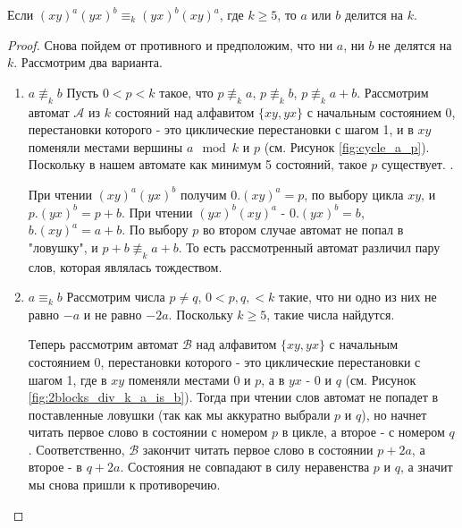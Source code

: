 \begin{lemma}\label{2blocks div k}
	Если $(xy)^a(yx)^b \equiv_k (yx)^b(xy)^a$, где $k \ge 5$, то $a$ или $b$ делится на $k$.
\end{lemma}
\begin{proof}
	Снова пойдем от противного и предположим, что ни $a$, ни $b$ не делятся на $k$. Рассмотрим два варианта.
	\begin{enumerate}
		\item $a \not \equiv_k b$
		Пусть $0 < p <k$ такое, что $p \not \equiv_k a$, $p \not \equiv_k b$, $p \not \equiv_k a+b$.
		Рассмотрим автомат $\mathscr{A}$ из $k$ состояний над алфавитом $\{xy, yx\}$ с начальным состоянием 0, перестановки которого - это циклические перестановки с шагом 1, и в $xy$ поменяли местами вершины $a \mod k$ и $p$ (см. Рисунок \ref{fig:cycle_a_p}). Поскольку в нашем автомате как минимум 5 состояний, такое $p$ существует. 
		.
		
		При чтении $(xy)^a(yx)^b$ получим $0.(xy)^a = p$, по выбору цикла $xy$, и $p.(yx)^b = p+b$.
		При чтении $(yx)^b(xy)^a$ - $0.(yx)^b = b$, $b.(xy)^a = a+b$. По выбору $p$ во втором случае автомат не попал в "ловушку", и $p+b \not \equiv_k a+b$.
		То есть рассмотренный автомат различил пару слов, которая являлась тождеством.
		
		\item $a \equiv_k b$
		Рассмотрим числа $p \ne q$, $0 < p, q, < k$ такие, что ни одно из них не равно $-a$ и не равно $-2a$. Поскольку $k \ge 5$, такие числа найдутся.
		
		Теперь рассмотрим автомат $\mathscr{B}$ над алфавитом $\{xy, yx\}$ с начальным состоянием 0, перестановки которого - это циклические перестановки с шагом 1, где в $xy$ поменяли местами 0 и $p$, а в $yx$ - 0 и $q$ (см. Рисунок \ref{fig:2blocks_div_k_a_is_b}).
		Тогда при чтении слов автомат не попадет в поставленные ловушки (так как мы аккуратно выбрали $p$ и $q$), но начнет читать первое слово в состоянии с номером $p$ в цикле, а второе - с номером $q$. Соответственно, $\mathscr{B}$ закончит читать первое слово в состоянии $p+2a$, а второе - в $q + 2a$. Состояния не совпадают в силу неравенства $p$ и $q$, а значит мы снова пришли к противоречию.
	\end{enumerate}
\end{proof}
 
